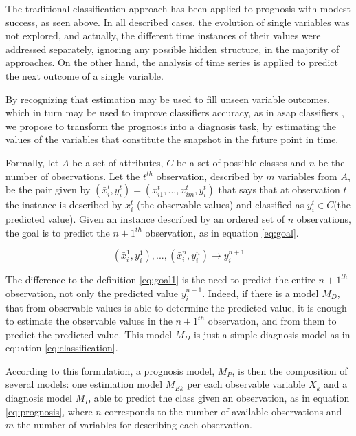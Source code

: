 The traditional classification approach has been applied to prognosis with modest success, as seen above. In all described 
cases, the evolution of single variables was not explored, and actually, the different time instances of their values were
 addressed separately, ignoring any possible hidden structure, in the majority of approaches. On the other hand, the analysis 
 of time series is applied to predict the next outcome of a single variable.

By recognizing that estimation may be used to fill unseen variable outcomes, which in turn may be used to improve classifiers
 accuracy, as in asap classifiers \cite{Antunes2010}, we propose to transform the prognosis into a diagnosis task, by estimating the values
 of the variables that constitute the snapshot in the future point in time.

Formally, let $A$ be a set of attributes, $C$ be a set of possible classes and $n$ be the number of observations. Let the $t^{th}$ observation,
 described by $m$ variables from $A$, be the pair given by $(\bar{x}_i^t,y_i^t)=(x_{i1}^t,...,x_{im}^t,y_i^t)$ that says that at observation $t$
 the instance is described by $x_i^t$ (the observable values) and classified as $y_i^t \in C$(the predicted value). Given an instance 
 described by an ordered set of $n$ observations, the goal is to predict the ${n+1}^{th}$ observation, as in equation \ref{eq:goal}.

\begin{equation}
	(\bar{x}_i^1,y_i^1 ),...,(\bar{x}_i^n,y_i^n ) \rightarrow y_i^{n+1}
\label{eq:goal}
\end{equation}

The difference to the definition \ref{eq:goal1} is the need to predict the entire ${n+1}^{th}$ observation, not only the predicted 
value $y_i^{n+1}$. Indeed, if there is a model $M_D$, that from observable values is able to determine the predicted value, it is 
enough to estimate the observable values in the ${n+1}^{th}$ observation, and from them to predict the predicted value. This model $M_D$ is
 just a simple diagnosis model as in equation \ref{eq:classification}.

 According to this formulation, a prognosis model, $M_P$, is then the composition of several models: one estimation model $M_{Ek}$ per each 
 observable variable $X_k$ and a diagnosis model $M_D$ able to predict the class given an observation, as in equation \ref{eq:prognosis}, where $n$ corresponds 
 to the number of available observations and $m$ the number of variables for describing each observation.

